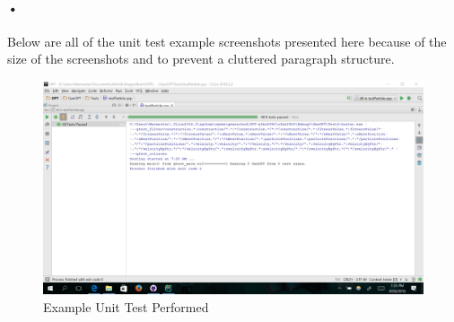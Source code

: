 \documentclass[11pt]{article}
\begin{document}
\paragraph{•}
Below are all of the unit test example screenshots presented here because of the size of the screenshots and to prevent a cluttered paragraph structure.
\begin{figure}[h]
\includegraphics[scale=0.2]{Particle.png}
\caption{Example Unit Test Performed}
\end{figure}
\end{document}

